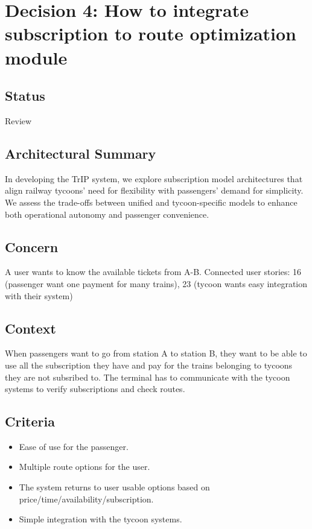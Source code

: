 \section*{Decision 4: How to integrate subscription to route optimization module}

\subsection*{Status}
Review

\subsection*{Architectural Summary}
In developing the TrIP system, we explore subscription model architectures that align railway tycoons' need for flexibility with passengers' demand for simplicity. 
We assess the trade-offs between unified and tycoon-specific models to enhance both operational autonomy and passenger convenience.

\subsection*{Concern}
A user wants to know the available tickets from A-B. 
Connected user stories: 16 (passenger want one payment for many trains), 23 (tycoon wants easy integration with their system)

\subsection*{Context}
When passengers want to go from station A to station B, they want to be able to use all the subscription they have and pay for the trains belonging to tycoons they are not subsribed to.
The terminal has to communicate with the tycoon systems to verify subscriptions and check routes.

\subsection*{Criteria}
\begin{itemize}
\item Ease of use for the passenger.
\item Multiple route options for the user.
\item The system returns to user usable options based on price/time/availability/subscription.
\item Simple integration with the tycoon systems.
\end{itemize}

